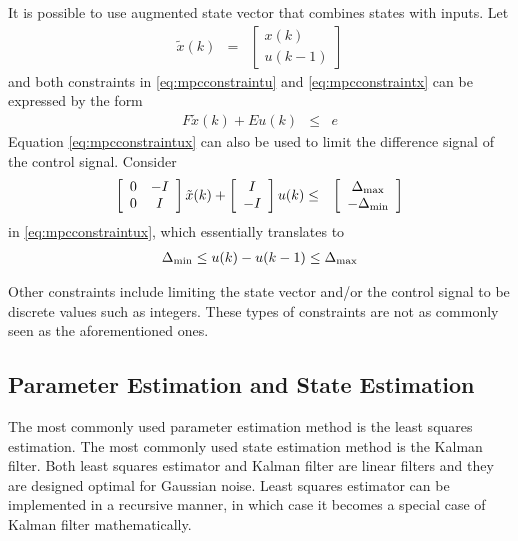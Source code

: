 It is possible to use augmented state vector that combines states with inputs. Let
\begin{eqnarray}
	\tilde{x}(k) &=& \left[\begin{array}{c}
	x(k) \\ u(k-1)
\end{array}\right] \nonumber
\end{eqnarray}
and both constraints in \eqref{eq:mpcconstraintu} and \eqref{eq:mpcconstraintx} can be expressed by the form
\begin{eqnarray}
	F\tilde{x}(k) + Eu(k) &\leq& e \label{eq:mpcconstraintux}
\end{eqnarray}
Equation \eqref{eq:mpcconstraintux} can also be used to limit the difference signal of the control signal. Consider
\begin{eqnarray}
	\left[\begin{array}{cc}
		0 & -I \\ 0 & I
	\end{array}\right]\tilde{x}(k) + \left[\begin{array}{c}
		I \\ -I
	\end{array}\right]u(k) &\leq& \left[\begin{array}{c}
		\Delta_{\textup{max}} \\ -\Delta_{\textup{min}}
	\end{array}\right] \nonumber
\end{eqnarray}
in \eqref{eq:mpcconstraintux}, which essentially translates to
\begin{eqnarray}
	\Delta_{\textup{min}} \leq u(k) - u(k-1) \leq \Delta_{\textup{max}} \nonumber
\end{eqnarray}

Other constraints include limiting the state vector and/or the control signal to be discrete values such as integers. These types of constraints are not as commonly seen as the aforementioned ones.

\subsection{Parameter Estimation and State Estimation}

The most commonly used parameter estimation method is the least squares estimation. The most commonly used state estimation method is the Kalman filter. Both least squares estimator and Kalman filter are linear filters and they are designed optimal for Gaussian noise. Least squares estimator can be implemented in a recursive manner, in which case it becomes a special case of Kalman filter mathematically.

